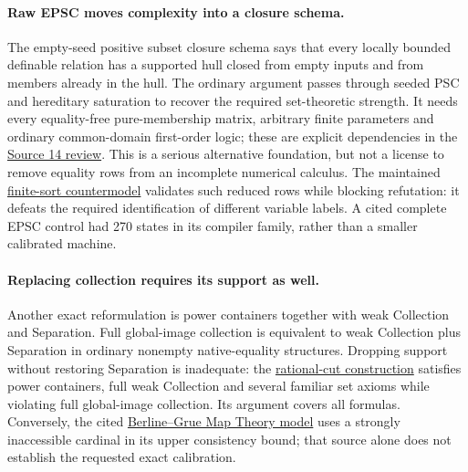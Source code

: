 \paragraph{Raw EPSC moves complexity into a closure schema.}
The empty-seed positive subset closure schema says that every locally
bounded definable relation has a supported hull closed from empty inputs
and from members already in the hull. The ordinary argument passes through
seeded PSC and hereditary saturation to recover the required set-theoretic
strength. It needs every equality-free pure-membership matrix, arbitrary finite
parameters and ordinary common-domain first-order logic; these are explicit
dependencies in the
\href{https://github.com/VladimirReshetnikov/ProveIt/blob/13ec39ed43148b1807f51ed6e6528e1c84659562/SetTheory/Cardinals/docs/reports/set-theory/zfc-closure-kernels/intake-146-source-14.md}{Source 14 review}.
This is a serious alternative foundation, but not a license to remove
equality rows from an incomplete numerical calculus. The maintained
\href{https://github.com/VladimirReshetnikov/ProveIt/blob/13ec39ed43148b1807f51ed6e6528e1c84659562/Computability/BusyBeaver/Research/ZFC/typed_countermodel.md}{finite-sort countermodel}
validates such reduced rows while blocking refutation: it defeats the
required identification of different variable labels. A cited complete
EPSC control had 270 states in its compiler family, rather than a smaller
calibrated machine.

\paragraph{Replacing collection requires its support as well.}
Another exact reformulation is power containers together with weak
Collection and Separation. Full global-image collection is equivalent to
weak Collection plus Separation in ordinary nonempty native-equality
structures. Dropping support without restoring Separation is inadequate:
the
\href{https://github.com/VladimirReshetnikov/ProveIt/blob/13ec39ed43148b1807f51ed6e6528e1c84659562/SetTheory/Cardinals/docs/reports/set-theory/zfc-closure-kernels/intake-170.md}{rational-cut construction}
satisfies power containers, full weak Collection and several familiar
set axioms while violating full global-image collection. Its argument
covers all formulas. Conversely, the cited
\href{https://hjemmesider.diku.dk/~grue/papers/BerlineGrue97/BerlineGrue97.pdf}{Berline--Grue Map Theory model}
uses a strongly inaccessible cardinal in its upper consistency bound;
that source alone does not establish the requested exact calibration.

